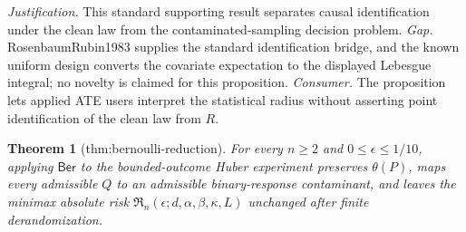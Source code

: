 \documentclass{article}
\newtheorem{theorem}{Theorem}
\begin{document}
\par\smallskip\noindent \textit{Justification.} This standard supporting result separates causal identification under the clean law from the contaminated-sampling decision problem. \textit{Gap.} RosenbaumRubin1983 supplies the standard identification bridge, and the known uniform design converts the covariate expectation to the displayed Lebesgue integral; no novelty is claimed for this proposition. \textit{Consumer.} The proposition lets applied ATE users interpret the statistical radius without asserting point identification of the clean law from \(R\).

\begin{theorem}[thm:bernoulli-reduction]\label{thm:bernoulli-reduction}
For every \(n\geq2\) and \(0\leq\epsilon\leq1/10\), applying \(\mathsf{Ber}\) to the bounded-outcome Huber experiment preserves \(\theta(P)\), maps every admissible \(Q\) to an admissible binary-response contaminant, and leaves the minimax absolute risk \(\mathfrak R_n(\epsilon;d,\alpha,\beta,\kappa,L)\) unchanged after finite derandomization.
\end{theorem}
\end{document}
